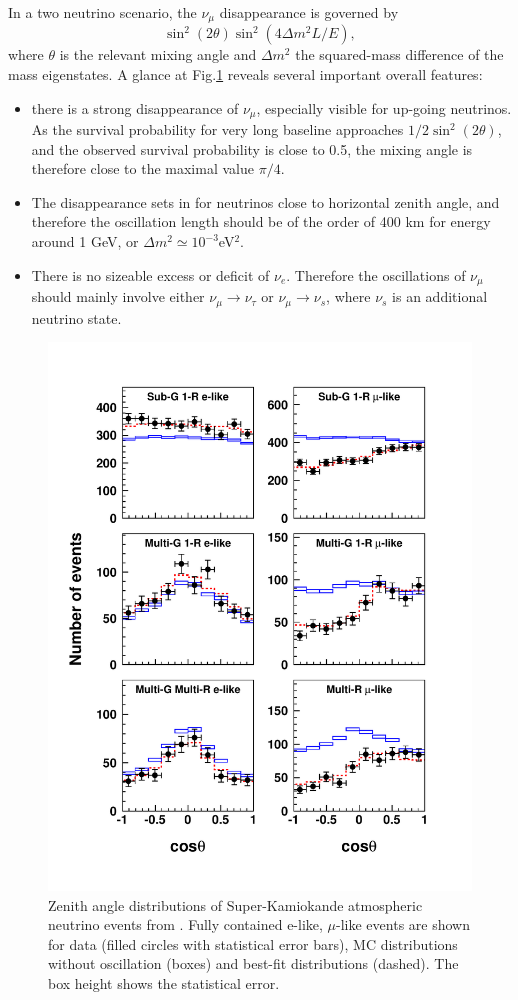 In a two neutrino scenario, the $\nu_\mu$ disappearance is governed by 
\begin{equation}
\sin^2 (2 \theta) \sin^2 (4 \Delta m^2 L /E),
\end{equation}
where $\theta$ is the relevant mixing angle and $\Delta m^2$ the squared-mass difference of the mass eigenstates. A glance at Fig.\ref{fig:sk-atm} reveals several important overall features: 
\begin{itemize}
\item there is a strong disappearance of $\nu_\mu$, especially visible for up-going neutrinos. As the survival probability for very long baseline approaches $1/2 \sin^2 (2 \theta)$, and the observed survival probability is close to 0.5, the mixing angle is therefore close to the maximal value $\pi/4$. 
\item The disappearance sets in for neutrinos close to horizontal zenith angle, and therefore the oscillation length should be of the order of 400 km for energy around 1 GeV, or $\Delta m^2 \simeq 10^{-3}$eV$^2$.  
\item There is no sizeable excess or deficit of $\nu_e$. Therefore the oscillations of $\nu_{\mu}$ should mainly involve either $\nu_{\mu} \rightarrow \nu_{\tau}$ or $\nu_{\mu} \rightarrow \nu_s$, where $\nu_s$ is an additional neutrino state.
\end{itemize}


\begin{figure}[htbp]
\centering
\includegraphics[width=0.8\linewidth]{figures/sk-2006-atm.pdf}
  \caption{Zenith angle distributions of Super-Kamiokande atmospheric neutrino events from \cite{Hosaka:2006zd}. Fully contained
e-like, $\mu$-like events
are shown for data (filled circles with statistical
error bars), MC distributions without oscillation (boxes)
and
best-fit distributions (dashed). The box height shows the
statistical error.}
 \label{fig:sk-atm}
 \end{figure}

